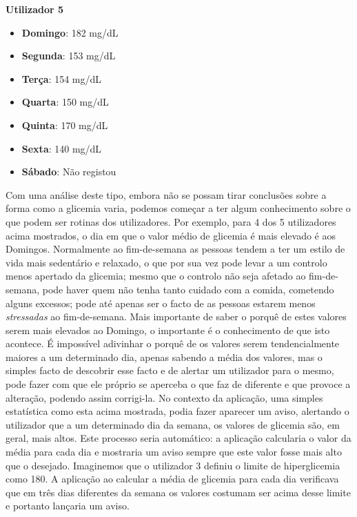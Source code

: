 \textbf{Utilizador 5}

\begin{itemize}[noitemsep]
\item \textbf{Domingo}: 182 mg/dL
\item \textbf{Segunda}: 153 mg/dL
\item \textbf{Terça}: 154 mg/dL
\item \textbf{Quarta}: 150 mg/dL
\item \textbf{Quinta}: 170 mg/dL
\item \textbf{Sexta}: 140 mg/dL
\item \textbf{Sábado}: Não registou
\end{itemize}

Com uma análise deste tipo, embora não se possam tirar conclusões sobre a forma como a glicemia varia, podemos começar a ter algum conhecimento sobre o que podem ser rotinas dos utilizadores. Por exemplo, para 4 dos 5 utilizadores acima mostrados, o dia em que o valor médio de glicemia é mais elevado é aos Domingos. Normalmente ao fim-de-semana as pessoas tendem a ter um estilo de vida mais sedentário e relaxado, o que por sua vez pode levar a um controlo menos apertado da glicemia; mesmo que o controlo não seja afetado ao fim-de-semana, pode haver quem não tenha tanto cuidado com a comida, cometendo alguns excessos; pode até apenas ser o facto de as pessoas estarem menos \textit{stressadas} ao fim-de-semana. Mais importante de saber o porquê de estes valores serem mais elevados ao Domingo, o importante é o conhecimento de que isto acontece. É impossível adivinhar o porquê de os valores serem tendencialmente maiores a um determinado dia, apenas sabendo a média dos valores, mas o simples facto de descobrir esse facto e de alertar um utilizador para o mesmo, pode fazer com que ele próprio se aperceba o que faz de diferente e que provoce a alteração, podendo assim corrigi-la. 
No contexto da aplicação, uma simples estatística como esta acima mostrada, podia fazer aparecer um aviso, alertando o utilizador que a um determinado dia da semana, os valores de glicemia são, em geral, mais altos. Este processo seria automático: a aplicação calcularia o valor da média para cada dia e mostraria um aviso sempre que este valor fosse mais alto que o desejado. Imaginemos que o utilizador 3 definiu o limite de hiperglicemia como 180. A aplicação ao calcular a média de glicemia para cada dia verificava que em três dias diferentes da semana os valores costumam ser acima desse limite e portanto lançaria um aviso.\newline

